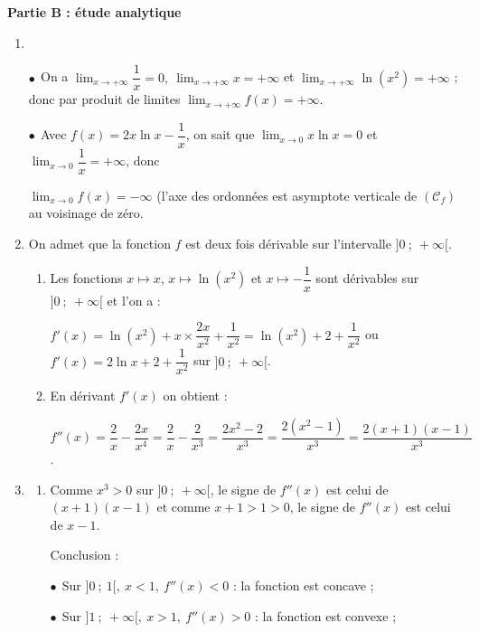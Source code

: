 \documentclass[10pt]{article}
\begin{document}
\bigskip

\textbf{Partie B : étude analytique}

\medskip

\begin{enumerate}
\item ~

$\bullet~~$On a $\displaystyle\lim_{x \to + \infty} \dfrac 1x = 0, \: \displaystyle\lim_{x \to + \infty} x = + \infty$ et $\displaystyle\lim_{x \to + \infty} \ln \left(x^2\right) = + \infty$ ; donc par produit de limites $\displaystyle\lim_{x \to + \infty} f(x) = + \infty$.

$\bullet~~$Avec $f(x) = 2x \ln x - \dfrac1x$, on sait que $\displaystyle\lim_{x \to 0} x \ln x = 0$ et $\displaystyle\lim_{x \to 0}\dfrac 1x = + \infty$, donc 

$\displaystyle\lim_{x \to 0}f(x) = - \infty$ (l'axe des ordonnées est asymptote verticale de $(\mathcal{C}_f)$ au voisinage de zéro.
\item On admet que la fonction $f$ est deux fois dérivable sur l'intervalle $]0~;~+\infty[$.
	\begin{enumerate}
		\item 
Les fonctions $x \longmapsto x$, \: $x \longmapsto \ln \left(x^2 \right)$ et $x \longmapsto - \dfrac 1x$ sont dérivables sur $]0~;~+ \infty[$ et l'on a :

$f'(x) = \ln \left(x^2 \right) + x \times \dfrac{2x}{x^2} + \dfrac{1}{x^2} = \ln \left(x^2 \right)+  2 +  \dfrac{1}{x^2}$ ou $f'(x) = 2\ln x + 2 + \dfrac{1}{x^2}$ sur $]0~;~+ \infty[$.
		\item 


En dérivant $f'(x)$ on obtient :

$f''(x) = \dfrac2x - \dfrac{2x}{x^4} = \dfrac2x - \dfrac{2}{x^3} = \dfrac{2x^2 - 2}{x^3} = \dfrac{2\left(x^2 - 1\right)}{x^3} = \dfrac{2(x + 1)(x - 1)}{x^3}$.
	\end{enumerate}
\item 
	\begin{enumerate}
		\item 
		Comme $x^3 > 0$ sur $]0~;~+ \infty[$, le signe de $f''(x)$ est celui de $(x + 1)(x - 1)$ et comme $x + 1 > 1 > 0$, le signe de $f''(x)$ est celui de $x - 1$.

Conclusion :

$\bullet~~$Sur $]0~;~1[,\: x < 1, \: f''(x) < 0$ : la fonction est concave ;

$\bullet~~$Sur $]1~;~+\infty[,\: x > 1, \: f''(x) > 0$ : la fonction est convexe ;


\end{enumerate}
\end{enumerate}
\end{document}
